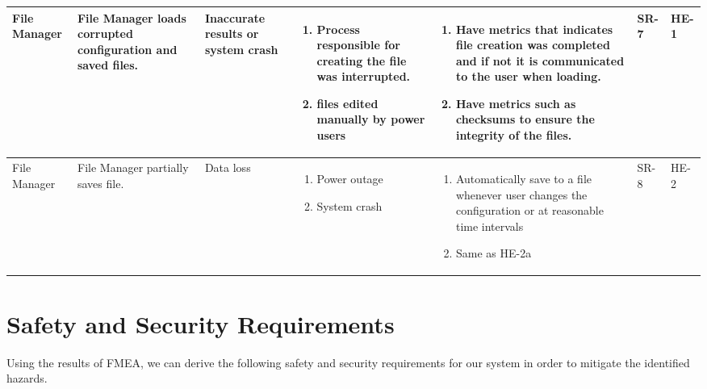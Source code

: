 \documentclass{article}
\begin{document}
\begin{landscape}
\begin{longtable}{|p{} | p{} | p{} | p{} | p{} | p{} | p{}|}
  File Manager & File Manager loads corrupted configuration and saved files.
  & Inaccurate results or system crash &
  \begin{enumerate}[leftmargin=*, label={\alph*.}, itemsep=1pt, topsep=0pt, partopsep=0pt] 
    \item Process responsible for creating the file was interrupted.
    \item files edited manually by power users
  \end{enumerate} &
  \begin{enumerate}[leftmargin=*, label={\alph*.}, itemsep=1pt, topsep=0pt, partopsep=0pt] 
    \item Have metrics that indicates file creation was completed and if not it is communicated to the user when loading.
    \item Have metrics such as checksums to ensure the integrity of the files.  
  \end{enumerate} &
  SR-7 & HE-1 \\

  \hline

  File Manager & File Manager partially saves file. & Data loss &
  \begin{enumerate}[leftmargin=*, label={\alph*.}, itemsep=1pt, topsep=0pt, partopsep=0pt] 
    \item Power outage
    \item System crash        
  \end{enumerate} &
  \begin{enumerate}[leftmargin=*, label={\alph*.}, itemsep=1pt, topsep=0pt, partopsep=0pt] 
    \item Automatically save to a file whenever user changes the configuration or at reasonable time intervals
    \item Same as HE-2a  
  \end{enumerate} & 
  SR-8 & HE-2 \\

  \hline

\end{longtable}

\end{landscape}

\newpage

\section{Safety and Security Requirements}
Using the results of FMEA, we can derive the following safety and security requirements for our system in order to mitigate the identified hazards. \\
\end{document}
